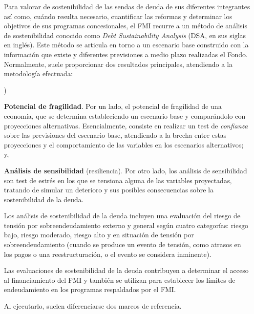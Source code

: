 \documentclass[10pt,a4paper]{article}
\newcounter{alphaitem}
\newenvironment{la}
      {\begin{list}{\alph{alphaitem})}{%
          \usecounter{alphaitem}%
          \setlength{\leftmargin}{1cm}%
          \setlength{\parskip}{3pt}%
          \setlength{\itemsep}{0pt}%
          \setlength{\parsep}{0pt}%
      }}
      {\end{list}}
\begin{document}
Para valorar de sostenibilidad de las sendas de deuda de sus diferentes integrantes así como, cuándo resulta necesario, cuantificar las reformas y determinar los objetivos de sus programas concesionales, el FMI recurre a un método de análisis de sostenibilidad conocido como \textit{Debt Sustainability Analysis} (DSA, en sus siglas en inglés). Este método se articula en torno a un escenario base construido con la información que existe y diferentes previsiones a medio plazo realizadas el Fondo. Normalmente, suele proporcionar dos resultados principales, atendiendo a la metodología efectuada:
\begin{la}
    \item \textbf{Potencial de fragilidad}. Por un lado, el potencial de fragilidad de una economía, que se determina estableciendo un escenario base y comparándolo con proyecciones alternativas. Esencialmente, consiste en realizar un test de \textit{confianza} sobre las previsiones del escenario base, atendiendo a la brecha entre estas proyecciones y el comportamiento de las variables en los escenarios alternativos; y,
    \item \textbf{Análisis de sensibilidad} (resiliencia). Por otro lado, los análisis de sensibilidad son test de estrés en los que se tensiona alguna de las variables proyectadas, tratando de simular un deterioro y sus posibles consecuencias sobre la sostenibilidad de la deuda. 
\end{la}

Los análisis de sostenibilidad de la deuda incluyen una evaluación del riesgo de tensión por sobreendeudamiento externo y general según cuatro categorías: riesgo bajo, riesgo moderado, riesgo alto y en situación de tensión por sobreendeudamiento (cuando se produce un evento de tensión, como atrasos en los pagos o una reestructuración, o el evento se considera inminente). 

Las evaluaciones de sostenibilidad de la deuda contribuyen a determinar el acceso al financiamiento del FMI y también se utilizan para establecer los límites de endeudamiento en los programas respaldados por el FMI.

Al ejecutarlo, suelen diferenciarse dos marcos de referencia. 
\end{document}
